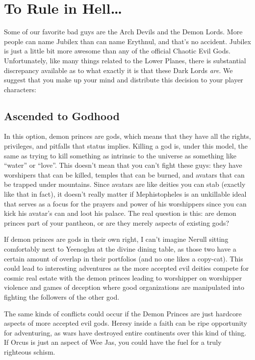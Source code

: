 \section{To Rule in Hell\ldots}

Some of our favorite bad guys are the Arch Devils and the Demon Lords. More people can name Jubilex than can name Erythnul, and that's no accident. Jubilex is just a little bit more awesome than any of the official Chaotic Evil Gods. Unfortunately, like many things related to the Lower Planes, there is substantial discrepancy available as to what exactly it is that these Dark Lords \textit{are}. We suggest that you make up your mind and distribute this decision to your player characters:

\subsection{Ascended to Godhood}

In this option, demon princes are gods, which means that they have all the rights, privileges, and pitfalls that status implies. Killing a god is, under this model, the same as trying to kill something as intrinsic to the universe as something like ``water'' or ``love''. This doesn't mean that you can't fight these guys: they have worshipers that can be killed, temples that can be burned, and avatars that can be trapped under mountains. Since avatars are like deities you can stab (exactly like that in fact), it doesn't really matter if Mephistopheles is an unkillable ideal that serves as a focus for the prayers and power of his worshippers since you can kick his avatar's can and loot his palace. The real question is this: are demon princes part of your pantheon, or are they merely aspects of existing gods?

If demon princes are gods in their own right, I can't imagine Nerull sitting comfortably next to Yeenoghu at the divine dining table, as those two have a certain amount of overlap in their portfolios (and no one likes a copy-cat). This could lead to interesting adventures as the more accepted evil deities compete for cosmic real estate with the demon princes leading to worshipper on worshipper violence and games of deception where good organizations are manipulated into fighting the followers of the other god.

The same kinds of conflicts could occur if the Demon Princes are just hardcore aspects of more accepted evil gods. Heresy inside a faith can be ripe opportunity for adventuring, as wars have destroyed entire continents over this kind of thing. If Orcus is just an aspect of Wee Jas, you could have the fuel for a truly righteous schism.

